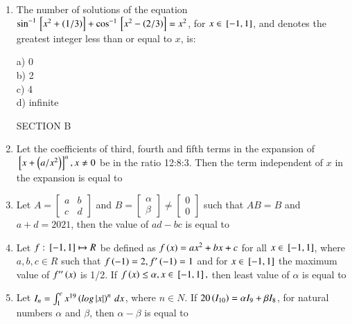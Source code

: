 \documentclass[journal]{IEEEtran}
\begin{document}
\begin{enumerate}
\item The number of solutions of the equation $\sin^{-1}{}\left[x^2+\left(1/3\right)\right]+\cos^{-1}{}\left[x^2-\left(2/3\right)\right]=x^2$, for $x \in {}\left[-1,1\right]$, and  denotes the greatest integer less than or equal to $x$, is:
\begin{multicols}{4}
    a) 0\\
    b) 2\\
    c) 4\\
    d) infinite
\end{multicols}
SECTION B
\item Let the coefficients of third, fourth and fifth terms in the expansion of ${}\left[x+\left(a/x^2\right)\right]^n, x\neq 0$ be in the ratio 12:8:3. Then the term independent of $x$ in the expansion is equal to 

\item Let $A=\begin{bmatrix}a & b \\ c& d\end{bmatrix}$ and $B=\begin{bmatrix}\alpha \\ \beta\end{bmatrix}\neq \begin{bmatrix}0\\0\end{bmatrix}$ such that $AB=B$ and $a+d=2021$, then the value of $ad-bc$ is equal to 

\item Let $f: {}\left[-1,1\right]\mapsto R$ be defined as $f\left(x\right)=ax^2 +bx+c$ for all $x\in {}\left[-1,1\right]$, where $a,b,c \in R$ such that $f\left(-1\right)=2, f^{\prime}\left(-1\right)=1$ and for $x\in {}\left[-1,1\right]$ the maximum value of $f^{\prime\prime}\left(x\right)$ is 1/2. If $f\left(x\right)\leq \alpha, x\in {}\left[-1,1\right],$ then least value of $\alpha$ is equal to

\item Let $I_n = 
\int_{1}^{e} x^{19}\left(log\left\vert x\right\vert\right)^n \, dx$, where $n \in N$. If $20\left(I_{10}\right)=\alpha I_9+\beta I_8$, for natural numbers $\alpha$ and $\beta$, then $\alpha-\beta$ is equal to


\end{enumerate}
\end{document}
